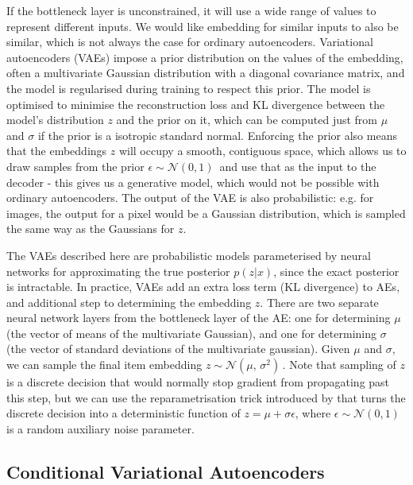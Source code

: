 If the bottleneck layer is unconstrained, it will use a wide range of values to represent different inputs.
We would like embedding for similar inputs to also be similar, which is not always the case for ordinary autoencoders.
Variational autoencoders (VAEs) impose a prior distribution on the values of the embedding, often a multivariate Gaussian distribution with a diagonal covariance matrix, and the model is regularised during training to respect this prior.
The model is optimised to minimise the reconstruction loss and KL divergence between the model's distribution $z$ and the prior on it, which can be computed just from $\mu$ and $\sigma$ if the prior is a isotropic standard normal.
Enforcing the prior also means that the embeddings $z$ will occupy a smooth, contiguous space, which allows us to draw samples from the prior $\epsilon \sim \mathcal{N}(0, 1)\,$ and use that as the input to the decoder - this gives us a generative model, which would not be possible with ordinary autoencoders.
The output of the VAE is also probabilistic: e.g. for images, the output for a pixel would be a Gaussian distribution, which is sampled the same way as the Gaussians for $z$.

The VAEs described here are probabilistic models parameterised by neural networks for approximating the true posterior $p(z|x)$, since the exact posterior is intractable.
In practice, VAEs add an extra loss term (KL divergence) to AEs, and additional step to determining the embedding $z$.
There are two separate neural network layers from the bottleneck layer of the AE:  one for determining $\mu$ (the vector of means of the multivariate Gaussian), and one for determining $\sigma$ (the vector of standard deviations of the multivariate gaussian).
Given $\mu$ and $\sigma$, we can sample the final item embedding $z \sim \mathcal{N}(\mu,\,\sigma^{2})\,$.
Note that sampling of $z$ is a discrete decision that would normally stop gradient from propagating past this step, but we can use the reparametrisation trick introduced by \cite{vae} that turns the discrete decision into a deterministic function of $z = \mu + \sigma\epsilon$, where $\epsilon \sim \mathcal{N}(0, 1)\,$ is a random auxiliary noise parameter.


\subsection{Conditional Variational Autoencoders}

